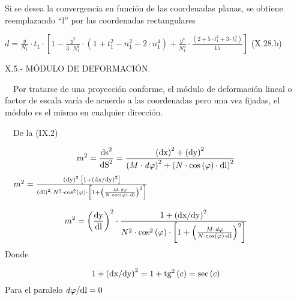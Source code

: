 \documentclass{tufte-book}
\newcommand\normalsubformula[1]{\text{\mathversion{normal}$#1$}}
\begin{document}
Si se desea la convergencia en función de las coordenadas planas, se
obtiene reemplazando {\textquotedblleft}l{\textquotedblright} por las
coordenadas rectangulares

 ${d=\frac{y}{N_{{1}}}\cdot t_{{1}}\cdot \left[1-\frac{y^{{2}}}{3\cdot
N_{{1}}^{{2}}}\cdot \left(1+t_{{1}}^{{2}}-n_{{1}}^{{2}}-2\cdot
n_{{1}}^{{4}}\right)+\frac{y^{{4}}}{N_{{1}}^{{4}}}\cdot
{\frac{\left(2+5\cdot t_{{1}}^{{2}}+3\cdot
t_{{1}}^{{4}}\right)}{\text{15}}}\right]}$  (X.28.b)

X.5.- MÓDULO DE DEFORMACIÓN.

\ \ Por tratarse de una proyección conforme, el módulo de
deformación lineal o factor de escala varía de acuerdo a las
coordenadas pero una vez fijadas, el módulo es el mismo en cualquier
dirección.

\ \ De la (IX.2)

\begin{equation*}
{m^{{2}}=\frac{\normalsubformula{\text{ds}}^{{2}}}{\normalsubformula{\text{dS}}^{{2}}}=\frac{\left(\normalsubformula{\text{dx}}\right)^{{2}}+\left(\normalsubformula{\text{dy}}\right)^{{2}}}{\left(M\cdot
\mathit{d\varphi }\right)^{{2}}+\left(N\cdot \text{cos}\left(\varphi
\right)\cdot \normalsubformula{\text{dl}}\right)^{{2}}}}
\end{equation*}
\ \ 
${m^{{2}}=\frac{\left(\normalsubformula{\text{dy}}\right)^{{2}}\cdot
\left[1+\left(\normalsubformula{\text{dx}}/\normalsubformula{\text{dy}}\right)^{{2}}\right]}{\left(\normalsubformula{\text{dl}}\right)^{{2}}\cdot
N^{{2}}\cdot \text{cos}^{{2}}\left(\varphi \right)\cdot
\left[1+\left(\frac{M\cdot \mathit{d\varphi }}{N\cdot
\text{cos}\left(\varphi \right)\cdot
\normalsubformula{\text{dl}}}\right)^{{2}}\right]}}$

\begin{equation*}
{m^{{2}}=\left(\frac{\normalsubformula{\text{dy}}}{\normalsubformula{\text{dl}}}\right)^{{2}}\cdot
{\frac{1+\left(\normalsubformula{\text{dx}}/\normalsubformula{\text{dy}}\right)^{{2}}}{N^{{2}}\cdot
\text{cos}^{{2}}\left(\varphi \right)\cdot \left[1+\left(\frac{M\cdot
\mathit{d\varphi }}{N\cdot \text{cos}\left(\varphi \right)\cdot
\normalsubformula{\text{dl}}}\right)^{{2}}\right]}}}
\end{equation*}
Donde

\begin{equation*}
{1+\left(\normalsubformula{\text{dx}}/\normalsubformula{\text{dy}}\right)^{{2}}=1+\normalsubformula{\text{tg}}^{{2}}\left(c\right)=\text{sec}\left(c\right)}
\end{equation*}
Para el paralelo  ${\mathit{d\varphi }/\normalsubformula{\text{dl}}=0}$
\end{document}
